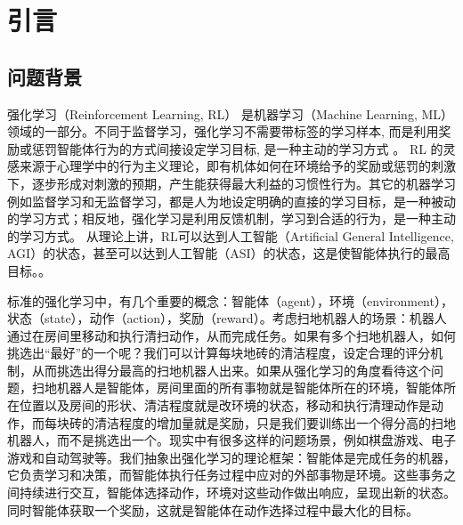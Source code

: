 
\chapter{引言}
\label{cha:introduction}

\section{问题背景}
\label{sec:background}

强化学习（Reinforcement Learning, RL）\cite{ReinforcementLearning2021} \cite{suttonReinforcementLearningIntroduction2018} 是机器学习（Machine Learning,  ML）领域的一部分。不同于监督学习，强化学习不需要带标签的学习样本, 而是利用奖励或惩罚智能体行为的方式间接设定学习目标, 是一种主动的学习方式 \cite{salvadorREINFORCEMENTLEARNINGLITERATURE2020}。 RL 的灵感来源于心理学中的行为主义理论，即有机体如何在环境给予的奖励或惩罚的刺激下，逐步形成对刺激的预期，产生能获得最大利益的习惯性行为\cite{ReinforcementLearning2021}。其它的机器学习例如监督学习和无监督学习，都是人为地设定明确的直接的学习目标，是一种被动的学习方式；相反地，强化学习是利用反馈机制，学习到合适的行为，是一种主动的学习方式。 从理论上讲，RL可以达到人工智能（Artificial General Intelligence, AGI）的状态，甚至可以达到人工智能（ASI）的状态，这是使智能体执行的最高目标。\cite{salvadorREINFORCEMENTLEARNINGLITERATURE2020}。

标准的强化学习中，有几个重要的概念：智能体（agent），环境（environment），状态（state），动作（action），奖励（reward）。考虑扫地机器人的场景：机器人通过在房间里移动和执行清扫动作，从而完成任务。如果有多个扫地机器人，如何挑选出“最好”的一个呢？我们可以计算每块地砖的清洁程度，设定合理的评分机制，从而挑选出得分最高的扫地机器人出来。如果从强化学习的角度看待这个问题，扫地机器人是智能体，房间里面的所有事物就是智能体所在的环境，智能体所在位置以及房间的形状、清洁程度就是改环境的状态，移动和执行清理动作是动作，而每块砖的清洁程度的增加量就是奖励，只是我们要训练出一个得分高的扫地机器人，而不是挑选出一个。现实中有很多这样的问题场景，例如棋盘游戏、电子游戏和自动驾驶等。我们抽象出强化学习的理论框架：智能体是完成任务的机器，它负责学习和决策，而智能体执行任务过程中应对的外部事物是环境。这些事务之间持续进行交互，智能体选择动作，环境对这些动作做出响应，呈现出新的状态。同时智能体获取一个奖励，这就是智能体在动作选择过程中最大化的目标。


